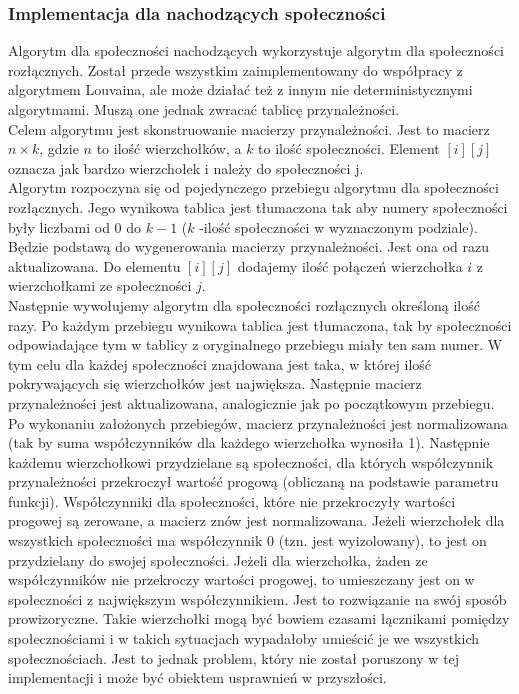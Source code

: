 \documentclass{article}
\begin{document}
\subsubsection{Implementacja dla nachodzących społeczności}
Algorytm dla społeczności nachodzących wykorzystuje algorytm dla społeczności rozłącznych. Został przede wszystkim zaimplementowany do współpracy z algorytmem Louvaina, ale może działać też z innym nie deterministycznymi algorytmami. Muszą one jednak zwracać tablicę przynależności. \\
Celem algorytmu jest skonstruowanie macierzy przynależności. Jest to macierz $n \times k$, gdzie $n$ to ilość wierzchołków, a $k$ to ilość społeczności. Element $[i][j]$ oznacza jak bardzo wierzchołek i należy do społeczności j.
\\ Algorytm rozpoczyna się od pojedynczego przebiegu algorytmu dla społeczności rozłącznych. Jego wynikowa tablica jest tłumaczona tak aby numery społeczności były liczbami od $0$ do $k-1$ ($k$ -ilość społeczności w wyznaczonym podziale). Będzie podstawą do wygenerowania macierzy przynależności. Jest ona od razu aktualizowana. Do elementu $[i][j]$ dodajemy ilość połączeń wierzchołka $i$ z wierzchołkami ze społeczności $j$.\\
Następnie wywołujemy algorytm dla społeczności rozłącznych określoną ilość razy. Po każdym przebiegu wynikowa tablica jest tłumaczona, tak by społeczności odpowiadające tym w tablicy z oryginalnego przebiegu miały ten sam numer. W tym celu dla każdej społeczności znajdowana jest taka, w której ilość pokrywających się wierzchołków jest największa. Następnie macierz przynależności jest aktualizowana, analogicznie jak po początkowym przebiegu.\\ 
Po wykonaniu założonych przebiegów, macierz przynależności jest normalizowana (tak by suma współczynników dla każdego wierzchołka wynosiła 1). Następnie każdemu wierzchołkowi przydzielane są społeczności, dla których współczynnik przynależności przekroczył wartość progową (obliczaną na podstawie parametru funkcji). Współczynniki dla społeczności, które nie przekroczyły wartości progowej są zerowane, a macierz znów jest normalizowana. Jeżeli wierzchołek dla wszystkich społeczności ma współczynnik 0 (tzn. jest wyizolowany), to jest on przydzielany do swojej społeczności. Jeżeli dla wierzchołka, żaden ze współczynników nie przekroczy wartości progowej, to umieszczany jest on w społeczności z największym współczynnikiem. Jest to rozwiązanie na swój sposób prowizoryczne. Takie wierzchołki mogą być bowiem czasami łącznikami pomiędzy społecznościami i w takich sytuacjach wypadałoby umieścić je we wszystkich społecznościach. Jest to jednak problem, który nie został poruszony w tej implementacji i może być obiektem usprawnień w przyszłości.
\end{document}
